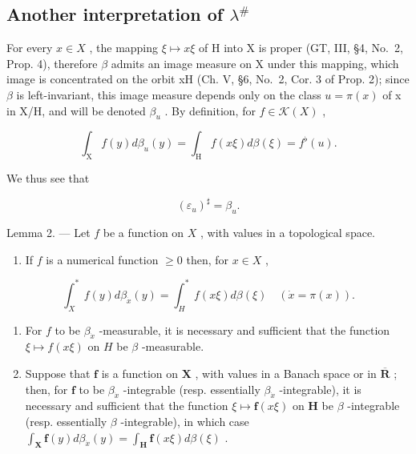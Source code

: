 \subsection{\texorpdfstring{Another interpretation of \(\lambda^{\#}\)}{Another interpretation of \textbackslash lambda\^{}\{\textbackslash\#\}}}

For every \(x \in X\) , the mapping \(\xi \mapsto x\xi\) of H into X is proper (GT, III, §4, No.~2, Prop. 4), therefore \(\beta\) admits an image measure on X under this mapping, which image is concentrated on the orbit xH (Ch. V, §6, No.~2, Cor. 3 of Prop. 2); since \(\beta\) is left-invariant, this image measure depends only on the class \(u = \pi(x)\) of x in X/H, and will be denoted \(\beta_{u}\) . By definition, for \(f \in \mathcal{K}(X)\) ,

\[
\int_ {\mathrm{X}} f (y) d \beta_ {u} (y) = \int_ {\mathrm{H}} f (x \xi) d \beta (\xi) = f ^ {\flat} (u).\tag{8}
\]

We thus see that

\[
(\varepsilon_ {u}) ^ {\sharp} = \beta_ {u}.\tag{9}
\]

Lemma 2. --- Let \(f\) be a function on \(X\) , with values in a topological space.

\begin{enumerate}
\def\labelenumi{\alph{enumi})}
\tightlist
\item
  If \(f\) is a numerical function \(\geqslant 0\) then, for \(x \in X\) ,
\end{enumerate}

\[
\int_ {X} ^ {*} f (y) d \beta_ {\dot {x}} (y) = \int_ {H} ^ {*} f (x \xi) d \beta (\xi) \quad (\dot {x} = \pi (x)).
\]

\begin{enumerate}
\def\labelenumi{\alph{enumi})}
\setcounter{enumi}{1}
\item
  For \(f\) to be \(\beta_{\dot{x}}\) -measurable, it is necessary and sufficient that the function \(\xi \mapsto f(x\xi)\) on \(H\) be \(\beta\) -measurable.
\item
  Suppose that \(\mathbf{f}\) is a function on \(\mathbf{X}\) , with values in a Banach space or in \(\overline{\mathbf{R}}\) ; then, for \(\mathbf{f}\) to be \(\beta_{\dot{x}}\) -integrable (resp. essentially \(\beta_{\dot{x}}\) -integrable), it is necessary and sufficient that the function \(\xi \mapsto \mathbf{f}(x\xi)\) on \(\mathbf{H}\) be \(\beta\) -integrable (resp. essentially \(\beta\) -integrable), in which case \(\int_{\mathbf{X}} \mathbf{f}(y) d\beta_{\dot{x}}(y) = \int_{\mathbf{H}} \mathbf{f}(x\xi) d\beta(\xi)\) .
\end{enumerate}

